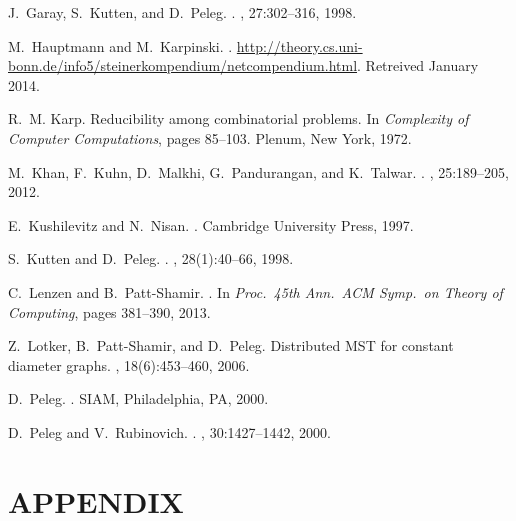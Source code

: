 \documentclass[letterpaper,11pt]{article}
\begin{document}
{\begin{thebibliography}{10}
J.~Garay, S.~Kutten, and D.~Peleg.
.
, 27:302--316, 1998.

M.~Hauptmann and M.~Karpinski.
.
\newblock
  \url{http://theory.cs.uni-bonn.de/info5/steinerkompendium/netcompendium.html}.
\newblock Retreived January 2014.

R.~M. Karp.
\newblock Reducibility among combinatorial problems.
\newblock In {\em {Complexity of Computer Computations}}, pages 85--103.
  Plenum, New York, 1972.

M.~Khan, F.~Kuhn, D.~Malkhi, G.~Pandurangan, and K.~Talwar.
.
, 25:189--205, 2012.

E.~Kushilevitz and N.~Nisan.
.
\newblock Cambridge University Press, 1997.

S.~Kutten and D.~Peleg.
.
, 28(1):40--66, 1998.

C.~Lenzen and B.~{Patt-Shamir}.
.
\newblock In {\em Proc.\ 45th Ann.\ ACM Symp.\ on Theory of Computing}, pages
  381--390, 2013.

Z.~Lotker, B.~{Patt-Shamir}, and D.~Peleg.
\newblock Distributed {MST} for constant diameter graphs.
, 18(6):453--460, 2006.

D.~Peleg.
.
\newblock SIAM, Philadelphia, PA, 2000.

D.~Peleg and V.~Rubinovich.
.
, 30:1427--1442, 2000.

\end{thebibliography}

}

\section*{APPENDIX}
\appendix
\end{document}
